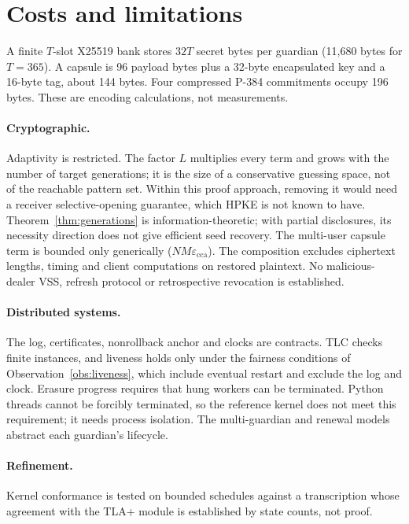 \documentclass[pdflatex,sn-mathphys-num]{sn-jnl}
\theoremstyle{plain}
\theoremstyle{definition}
\begin{document}
\section{Costs and limitations}\label{sec:limits}

A finite $T$-slot X25519 bank stores $32T$ secret bytes per guardian (11,680 bytes for $T=365$). A capsule is 96 payload bytes plus a 32-byte encapsulated key and a 16-byte tag, about 144 bytes. Four compressed P-384 commitments occupy 196 bytes. These are encoding calculations, not measurements.

\paragraph{Cryptographic.}
Adaptivity is restricted. The factor $L$ multiplies every term and grows with the number of target generations; it is the size of a conservative guessing space, not of the reachable pattern set. Within this proof approach, removing it would need a receiver selective-opening guarantee, which HPKE is not known to have. Theorem~\ref{thm:generations} is information-theoretic; with partial disclosures, its necessity direction does not give efficient seed recovery. The multi-user capsule term is bounded only generically ($NM\varepsilon_{\mathrm{cca}}$). The composition excludes ciphertext lengths, timing and client computations on restored plaintext. No malicious-dealer VSS, refresh protocol or retrospective revocation is established.

\paragraph{Distributed systems.}
The log, certificates, nonrollback anchor and clocks are contracts. TLC checks finite instances, and liveness holds only under the fairness conditions of Observation~\ref{obs:liveness}, which include eventual restart and exclude the log and clock. Erasure progress requires that hung workers can be terminated. Python threads cannot be forcibly terminated, so the reference kernel does not meet this requirement; it needs process isolation. The multi-guardian and renewal models abstract each guardian's lifecycle.

\paragraph{Refinement.}
Kernel conformance is tested on bounded schedules against a transcription whose agreement with the TLA+ module is established by state counts, not proof.
\end{document}
